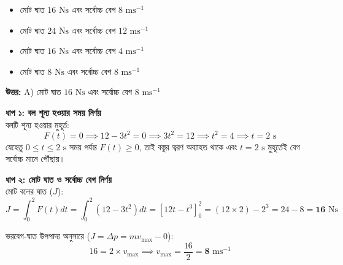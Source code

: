 \documentclass[12pt, a4paper]{article}
\begin{document}
\vspace{1em}
\begin{center}
\end{center}
\vspace{1em}

\begin{itemize}[label={}, leftmargin=1cm, itemsep=0.5em]
    \item[\textbf{A)}] মোট ঘাত $16\text{ Ns}$ এবং সর্বোচ্চ বেগ $8\text{ ms}^{-1}$
    \item[\textbf{B)}] মোট ঘাত $24\text{ Ns}$ এবং সর্বোচ্চ বেগ $12\text{ ms}^{-1}$
    \item[\textbf{C)}] মোট ঘাত $16\text{ Ns}$ এবং সর্বোচ্চ বেগ $4\text{ ms}^{-1}$
    \item[\textbf{D)}] মোট ঘাত $8\text{ Ns}$ এবং সর্বোচ্চ বেগ $8\text{ ms}^{-1}$
\end{itemize}

\vspace{0.5em}
\begin{tcolorbox}[answerbox]
    \textbf{\color{success} উত্তর:} A) মোট ঘাত $16\text{ Ns}$ এবং সর্বোচ্চ বেগ $8\text{ ms}^{-1}$
\end{tcolorbox}
\vspace{1em}

\begin{tcolorbox}[solutionbox={সমাধান (Solution)}]
    \noindent
    \textbf{ধাপ ১: বল শূন্য হওয়ার সময় নির্ণয়} \\
    বলটি শূন্য হওয়ার মুহূর্ত:
    \[ F(t) = 0 \implies 12 - 3t^2 = 0 \implies 3t^2 = 12 \implies t^2 = 4 \implies t = 2\text{ s} \]
    যেহেতু $0 \le t \le 2\text{ s}$ সময় পর্যন্ত $F(t) \ge 0$, তাই বস্তুর ত্বরণ অব্যাহত থাকে এবং $t = 2\text{ s}$ মুহূর্তেই বেগ সর্বোচ্চ মানে পৌঁছায়।
    
    \vspace{0.5em}
    \noindent\textbf{ধাপ ২: মোট ঘাত ও সর্বোচ্চ বেগ নির্ণয়} \\
    মোট বলের ঘাত ($J$):
    \[ J = \int_0^2 F(t) dt = \int_0^2 (12 - 3t^2) dt = \left[ 12t - t^3 \right]_0^2 = (12 \times 2) - 2^3 = 24 - 8 = \mathbf{16}\text{ Ns} \]
    
    ভরবেগ-ঘাত উপপাদ্য অনুসারে ($J = \Delta p = m v_{\max} - 0$):
    \[ 16 = 2 \times v_{\max} \implies v_{\max} = \frac{16}{2} = \mathbf{8}\text{ ms}^{-1} \]
\end{tcolorbox}
\end{document}

